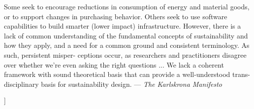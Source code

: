 \documentclass[11pt,twocolumn]{article}
\begin{document}
\begin{@twocolumnfalse}
\begin{lrbox}{\qboxii}
\begin{frquote}Some seek to encourage reductions in consumption of energy
and  material  goods,  or  to  support  changes  in  purchasing
behavior.  Others  seek  to  use  software  capabilities  to  build
smarter (lower impact) infrastructure. However, there is a lack
of  common  understanding  of  the  fundamental  concepts  of
sustainability and how they apply, and a need for a common
ground and consistent terminology. As such, persistent misper-
ceptions occur, as researchers and practitioners disagree over
whether we're even asking the right questions ...
We  lack  a  coherent  framework  with  sound  theoretical  basis
that can provide a well-understood trans-disciplinary basis for
sustainability design. --- \textit{The Karlskrona Manifesto} {\cite[p. 5]{Karlskrona}}
\end{frquote}
\end{lrbox}	
\vspace{1em}
\begin{flushright}%
\usebox{\qboxii}
\end{flushright}
\vspace{1em}
\decoline{}
\vspace{3em}
\end{@twocolumnfalse}]









%


\end{document}
